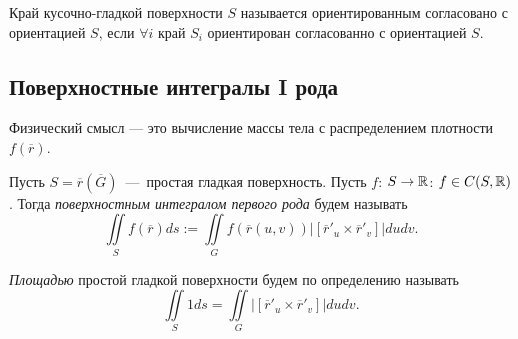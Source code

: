 \begin{definition}
    Край кусочно-гладкой поверхности $S$ называется ориентированным согласовано с ориентацией $S$, если $\forall i$ край $S_i$ ориентирован согласованно с ориентацией $S$.
\end{definition}

\subsection{Поверхностные интегралы I рода}
Физический смысл --- это вычисление массы тела с распределением плотности $f(\overline{r})$.
\begin{definition}
    Пусть $S = \overline{r}(\overline{G})$~---~простая гладкая поверхность. Пусть $f$: $S \rightarrow \mathbb{R}$: $f \in C(S, \mathbb{R})$. Тогда \textit{поверхностным интегралом первого рода} будем называть \[\iint\limits_S f(\overline{r})ds := \iint\limits_G f(\overline{r}(u, v))|[\overline{r}'_u \times \overline{r}'_v]|dudv.\]
\end{definition}
\begin{definition}
    \textit{Площадью} простой гладкой поверхности будем по определению называть \[\iint\limits_S 1ds = \iint\limits_G |[\overline{r}'_u \times \overline{r}'_v]|dudv.\]
\end{definition}
